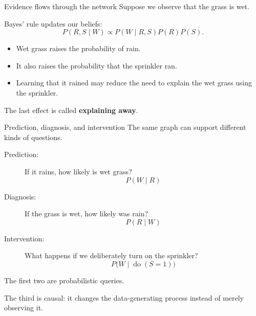 \documentclass[aspectratio=43,11pt]{beamer}
\begin{document}
\begin{frame}{Evidence flows through the network}
\footnotesize
Suppose we observe that the grass is wet.
\begin{center}
\end{center}

Bayes' rule updates our beliefs:
\[
P(R,S\mid W)
\propto
P(W\mid R,S)P(R)P(S).
\]

\begin{itemize}
  \item Wet grass raises the probability of rain.
  \item It also raises the probability that the sprinkler ran.
  \item Learning that it rained may reduce the need to explain the wet
        grass using the sprinkler.
\end{itemize}

The last effect is called \textbf{explaining away}.

\end{frame}

\begin{frame}{Prediction, diagnosis, and intervention}
\small
The same graph can support different kinds of questions.

\begin{description}

  \item[Prediction:]
  If it rains, how likely is wet grass?
  \[
  P(W\mid R)
  \]

  \item[Diagnosis:]
  If the grass is wet, how likely was rain?
  \[
  P(R\mid W)
  \]

  \item[Intervention:]
  What happens if we deliberately turn on the sprinkler?
  \[
  P\bigl(W\mid \operatorname{do}(S=1)\bigr)
  \]

\end{description}

The first two are probabilistic queries.

The third is causal: it changes the data-generating process instead of
merely observing it.

\end{frame}
\end{document}
